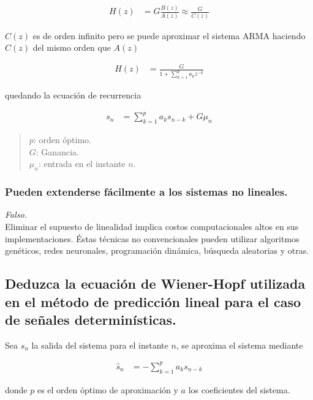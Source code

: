 \documentclass[a4paper,10pt,spanish,oneside]{article}
\begin{document}
\begin{align*}
H(z) &= G\frac{B(z)}{A(z)}\approx\frac{G}{C(z)}
\end{align*}

$C(z)$ es de orden infinito pero se puede aproximar el sistema ARMA haciendo $C(z)$ del mismo orden  que $A(z)$

\begin{align*}
H(z) &= \frac{G}{1+\sum_{k=1}^{p}a_{k}z^{-k}}
\end{align*}

quedando la ecuación de recurrencia

\begin{align*}
s_{n} &= \sum_{k=1}^{p}a_{k}s_{n-k}+G\mu_{n}
\end{align*}

\begin{quote}
$p$: orden óptimo.\\
$G$: Ganancia.\\
$\mu_{n}$: entrada en el instante $n$.\\
\end{quote}

\subsubsection{Pueden extenderse fácilmente a los sistemas no lineales.}

\textit{Falso.}\\

Eliminar el supuesto de linealidad implica costos computacionales altos en sus implementaciones. Éstas técnicas no convencionales pueden utilizar algoritmos genéticos, redes neuronales, programación dinámica, búsqueda aleatorias y otras.

\subsection{Deduzca la ecuación de Wiener-Hopf utilizada en el método de predicción lineal para el caso de señales determinísticas.}

Sea $s_{n}$ la salida del sistema para el instante $n$, se aproxima el sistema mediante

\begin{align*}
\hat{s}_{n} &= -\sum_{k=1}^{p}a_{k}s_{n-k}
\end{align*}

donde $p$ es el orden óptimo de aproximación y $a$ los coeficientes del sistema.\\
\end{document}
